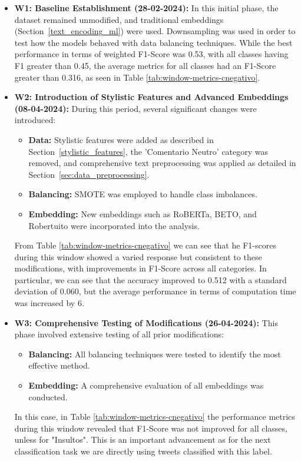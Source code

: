 \begin{itemize}
    \item \textbf{W1: Baseline Establishment (28-02-2024):} In this initial phase, the dataset remained unmodified, and traditional embeddings (Section~\ref{text_encoding_ml}) were used. Downsampling was used in order to test how the models behaved with data balancing techniques. While the best performance in terms of weighted F1-Score was 0.53, with all classes having F1 greater than 0.45, the average metrics for all classes had an F1-Score greater than 0.316, as seen in Table \ref{tab:window-metrics-cnegativo}.

    \item \textbf{W2: Introduction of Stylistic Features and Advanced Embeddings (08-04-2024):} During this period, several significant changes were introduced:
        \begin{itemize}
            \item \textbf{Data:} Stylistic features were added as described in Section~\ref{stylistic_features}, the 'Comentario Neutro' category was removed, and comprehensive text preprocessing was applied as detailed in Section~\ref{sec:data_preprocessing}.
            \item \textbf{Balancing:} SMOTE was employed to handle class imbalances.
            \item \textbf{Embedding:} New embeddings such as RoBERTa, BETO, and Robertuito were incorporated into the analysis.
        \end{itemize}
    From Table \ref{tab:window-metrics-cnegativo} we can see that he F1-scores during this window showed a varied response but consistent to these modifications, with improvements in F1-Score across all categories. In particular, we can see that the accuracy improved to 0.512 with a standard deviation of 0.060, but the average performance in terms of computation time was increased by 6.

    \item \textbf{W3: Comprehensive Testing of Modifications (26-04-2024):} This phase involved extensive testing of all prior modifications:
        \begin{itemize}
            \item \textbf{Balancing:} All balancing techniques were tested to identify the most effective method.
            \item \textbf{Embedding:} A comprehensive evaluation of all embeddings was conducted.
        \end{itemize}
    In this case, in Table \ref{tab:window-metrics-cnegativo} the performance metrics during this window revealed that F1-Score was not improved for all classes, unless for "Insultos". This is an important advancement as for the next classification task we are directly using tweets classified with this label.


\end{itemize}
